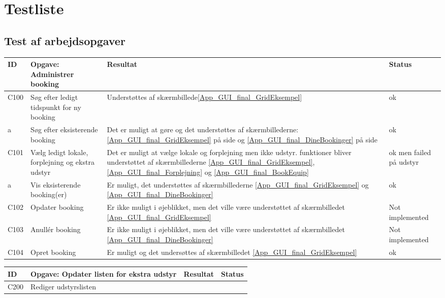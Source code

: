 \section{Testliste}
\label{App_Test_ListOfTest}

\subsection{Test af arbejdsopgaver}
\label{App_Test_ListOfTest_Work}

\begin{tabularx}{\textwidth}{ |X|X|X|X| }
\hline
	ID & Opgave: Administrer booking & Resultat & Status\\ 
\hline
	C100 & Søg efter ledigt tidspunkt for ny booking & Understøttes af skærmbillede\ref{App_GUI_final_GridEksempel} & ok \\
\hline
	a & Søg efter eksisterende booking & Det er muligt at gøre og det understøttes af skærmbillederne: \ref{App_GUI_final_GridEksempel} på side \pageref{App_GUI_final_GridEksempel} og \ref{App_GUI_final_DineBookinger} på side \pageref{App_GUI_final_DineBookinger} & ok \\
\hline
	C101 & Vælg ledigt lokale, forplejning og ekstra udstyr & Det er muligt at vælge lokale og forplejning men ikke udstyr. funktioner bliver understøttet af skærmbillederne \ref{App_GUI_final_GridEksempel}, \ref{App_GUI_final_Forplejning} og \ref{App_GUI_final_BookEquip}  & ok men failed på udstyr \\
\hline
	a & Vis eksisterende booking(er) & Er muligt, det understøttes af skærmbillederne \ref{App_GUI_final_GridEksempel} og \ref{App_GUI_final_DineBookinger} & ok \\
\hline
	C102 & Opdater booking & Er ikke muligt i øjeblikket, men det ville være understøttet af skærmbilledet \ref{App_GUI_final_GridEksempel} & Not implemented \\
\hline
	C103 & Anullér booking & Er ikke muligt i øjeblikket, men det ville være understøttet af skærmbilledet \ref{App_GUI_final_DineBookinger} & Not implemented \\
\hline
	C104 & Opret booking & Er muligt og det undersøttes af skærmbilledet \ref{App_GUI_final_GridEksempel} & ok \\
\hline
\end{tabularx}

\begin{tabularx}{\textwidth}{ |X|X|X|X| }
\hline
	ID & Opgave: Opdater listen for ekstra udstyr & Resultat & Status\\ 
\hline
	C200 & Rediger udstyrslisten & & \\
\hline
\end{tabularx}

